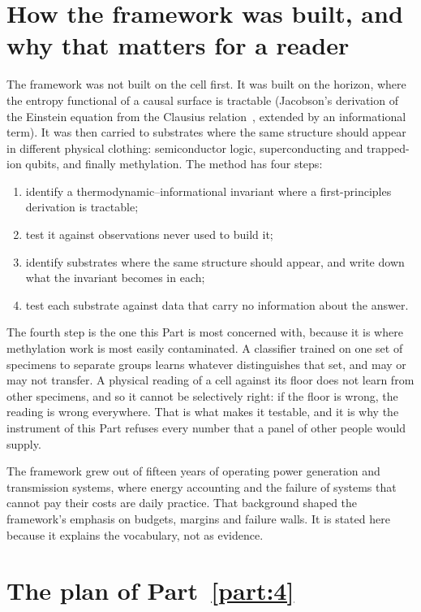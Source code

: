 \section{How the framework was built, and why that matters for a reader}

The framework was not built on the cell first. It was built on the horizon, where the entropy
functional of a causal surface is tractable (Jacobson's derivation of the Einstein equation from
the Clausius relation~\cite{Jacobson1995}, extended by an informational term). It was then carried
to substrates where the same structure should appear in different physical clothing:
semiconductor logic, superconducting and trapped-ion qubits, and finally methylation. The method has
four steps:
\begin{enumerate}
\item identify a thermodynamic--informational invariant where a first-principles derivation is
      tractable;
\item test it against observations never used to build it;
\item identify substrates where the same structure should appear, and write down what the
      invariant becomes in each;
\item test each substrate against data that carry no information about the answer.
\end{enumerate}
The fourth step is the one this Part is most concerned with, because it is where methylation work
is most easily contaminated. A classifier trained on one set of specimens to separate groups learns whatever
distinguishes that set, and may or may not transfer. A physical reading of a cell against its
floor does not learn from other specimens, and so it cannot be selectively right: if the floor is wrong,
the reading is wrong everywhere. That is what makes it testable, and it is why the instrument of
this Part refuses every number that a panel of other people would supply.

The framework grew out of fifteen years of operating power generation and transmission
systems, where energy accounting and the failure of systems that cannot pay their costs are daily
practice. That background shaped the framework's emphasis on budgets, margins and failure walls.
It is stated here because it explains the vocabulary, not as evidence.

\section{The plan of Part~\ref{part:4}}

